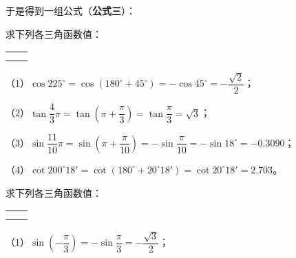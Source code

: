 于是得到一组公式（\textbf{公式三}）：

\begin{center}
\end{center}

\liti 求下列各三角函数值：
\begin{xiaoxiaotis}

    \begin{tabular}[t]{*{2}{@{}p{15em}}}
         &  \\
         & 
    \end{tabular}

\end{xiaoxiaotis}

\jie （1）$\cos 225^\circ = \cos(180^\circ + 45^\circ) = -\cos 45^\circ = -\dfrac{\sqrt{2}}{2}$；

\vspace{0.5em}
（2）$\tan \dfrac 4 3 \pi = \tan \left( \pi + \dfrac \pi 3 \right) = \tan \dfrac \pi 3 = \sqrt{3}$；
\vspace{0.5em}

（3）$\sin \dfrac{11}{10} \pi = \sin \left( \pi + \dfrac \pi {10} \right) = -\sin \dfrac \pi {10} = -\sin 18^\circ = -0.3090$；
\vspace{0.5em}

（4）$\cot 200^\circ 18' = \cot (180^\circ + 20^\circ 18') = \cot 20^\circ 18' = 2.703$。

\liti 求下列各三角函数值：
\begin{xiaoxiaotis}

    \begin{tabular}[t]{*{2}{@{}p{15em}}}
         &  \\
         & 
    \end{tabular}

\end{xiaoxiaotis}

\jie （1）$\sin \left( -\dfrac \pi 3 \right) = -\sin \dfrac \pi 3 = -\dfrac{\sqrt{3}}{2}$；

